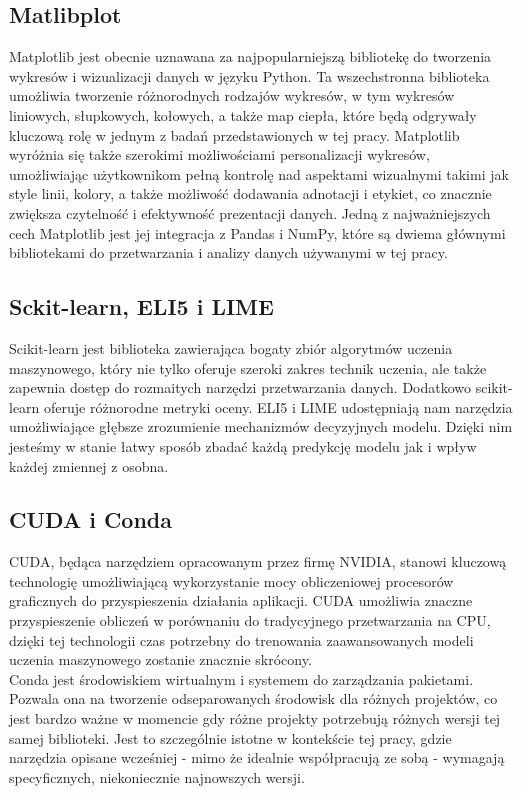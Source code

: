\documentclass[a4paper,twoside,12pt]{book}
\begin{document}
\subsection{Matlibplot}
Matplotlib jest obecnie uznawana za najpopularniejszą bibliotekę do tworzenia wykresów i wizualizacji danych w języku Python. Ta wszechstronna biblioteka umożliwia tworzenie różnorodnych rodzajów wykresów, w tym wykresów liniowych, słupkowych, kołowych, a także map ciepła, które będą odgrywały kluczową rolę w jednym z badań przedstawionych w tej pracy. Matplotlib wyróżnia się także szerokimi możliwościami personalizacji wykresów, umożliwiając użytkownikom pełną kontrolę nad aspektami wizualnymi takimi jak style linii, kolory, a także możliwość dodawania adnotacji i etykiet, co znacznie zwiększa czytelność i efektywność prezentacji danych. Jedną z najważniejszych cech Matplotlib jest jej integracja z Pandas i NumPy, które są dwiema głównymi bibliotekami do przetwarzania i analizy danych używanymi w tej pracy.

\subsection{Sckit-learn, ELI5 i LIME}
Scikit-learn jest biblioteka zawierająca bogaty zbiór algorytmów uczenia maszynowego, który nie tylko oferuje szeroki zakres technik uczenia, ale także zapewnia dostęp do rozmaitych narzędzi przetwarzania danych. Dodatkowo scikit-learn oferuje różnorodne metryki oceny.
ELI5 i LIME udostępniają nam narzędzia umożliwiające głębsze zrozumienie mechanizmów decyzyjnych modelu. Dzięki nim jesteśmy w stanie łatwy sposób zbadać każdą predykcję modelu jak i wpływ każdej zmiennej z osobna.
\subsection{CUDA i Conda}
CUDA, będąca narzędziem opracowanym przez firmę NVIDIA, stanowi kluczową technologię umożliwiającą wykorzystanie mocy obliczeniowej procesorów graficznych do przyspieszenia działania aplikacji. CUDA umożliwia znaczne przyspieszenie obliczeń w porównaniu do tradycyjnego przetwarzania na CPU, dzięki tej technologii czas potrzebny do trenowania zaawansowanych modeli uczenia maszynowego zostanie znacznie skrócony.\\

Conda jest środowiskiem wirtualnym i systemem do zarządzania pakietami. Pozwala ona na tworzenie odseparowanych środowisk dla różnych projektów, co jest bardzo ważne w momencie gdy różne projekty potrzebują różnych wersji tej samej biblioteki. Jest to szczególnie istotne w kontekście tej pracy, gdzie narzędzia opisane wcześniej - mimo że idealnie współpracują ze sobą - wymagają specyficznych, niekoniecznie najnowszych wersji.
\end{document}
